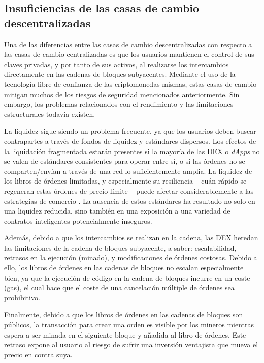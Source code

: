 \documentclass[UTF8,nofonts]{article}
\begin{document}
\begin{multicols}{2}
\subsection{Insuficiencias de las casas de cambio descentralizadas}
Una de las diferencias entre las casas de cambio descentralizadas con respecto a las casas de cambio centralizadas es que los usuarios mantienen el control de sus claves privadas, y por tanto de sus activos, al realizarse los intercambios directamente en las cadenas de bloques subyacentes. Mediante el uso de la tecnología libre de confianza de las criptomonedas mismas, estas casas de cambio mitigan muchos de los riesgos de seguridad mencionados anteriormente. Sin embargo, los problemas relacionados con el rendimiento y las limitaciones estructurales todavía existen. 

La liquidez sigue siendo un problema frecuente, ya que los usuarios deben buscar contrapartes a través de fondos de liquidez y estándares dispersos. Los efectos de la liquidación fragmentada estarán presentes si la mayoría de las DEX o \textit{dApps} no se valen de estándares consistentes para operar entre sí, o si las órdenes no se comparten/envían a través de una red lo suficientemente amplia. La liquidez de los libros de órdenes limitadas, y especialmente su resiliencia -- cuán rápido se regeneran estas órdenes de precio límite -- puede afectar considerablemente a las estrategias de comercio \cite{limitorderliquidity}. La ausencia de estos estándares ha resultado no solo en una liquidez reducida, sino también en una exposición a una variedad de contratos inteligentes potencialmente inseguros.

Además, debido a que los intercambios se realizan en la cadena, las DEX heredan las limitaciones de la cadena de bloques subyacente, a saber: escalabilidad, retrasos en la ejecución (minado), y modificaciones de órdenes costosas. Debido a ello, los libros de órdenes en las cadenas de bloques no escalan especialmente bien, ya que la ejecución de código en la cadena de bloques incurre en un coste (gas), el cual hace que el coste de una cancelación múltiple de órdenes sea prohibitivo.

Finalmente, debido a que los libros de órdenes en las cadenas de bloques son públicos, la transacción para crear una orden es visible por los mineros mientras espera a ser minada en el siguiente bloque y añadida al libro de órdenes. Este retraso expone al usuario al riesgo de sufrir una inversión ventajista que mueva el precio en contra suya.


\end{multicols}
\end{document}
